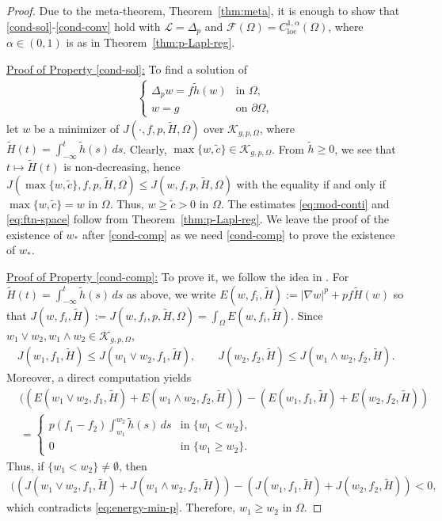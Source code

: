 \documentclass[11pt,oneside,english]{amsart}
\newcommand{\cL}{{\mathcal L}}
\newcommand{\cK}{{\mathcal K}}
\newcommand{\cF}{{\mathcal F}}
\newcommand{\al}{\alpha}
\newcommand{\loc}{\operatorname{loc}}
\newcommand{\D}{\nabla}
\numberwithin{equation}{section}
\theoremstyle{plain}
\numberwithin{equation}{section}
\begin{document}
\begin{proof}
Due to the meta-theorem, Theorem~\ref{thm:meta}, it is enough to show that \ref{cond-sol}-\ref{cond-conv} hold with $\cL=\Delta_p$ and $\cF(\Omega)=C^{1,\al}_{\loc}(\Omega)$, where $\al\in(0,1)$ is as in Theorem~\ref{thm:p-Lapl-reg}. 

\medskip

\noindent 
\underline{Proof of Property \ref{cond-sol}:} To find a solution of 
\begin{align*}
    \begin{cases}
        \Delta_pw=f\tilde h(w)&\text{in }\Omega,\\
        w=g&\text{on }\partial\Omega,
    \end{cases}
\end{align*}
let $w$ be a minimizer of $J(\cdot,f,p,\tilde H,\Omega)$ over $\cK_{g,p,\Omega}$, where $\tilde H(t)=\int_{-\infty}^t\tilde h(s)\,ds$. Clearly, $\max\{w,\tilde c\}\in \cK_{g,p,\Omega}$. From $\tilde h\ge0$, we see that $t\longmapsto \tilde H(t)$ is non-decreasing, hence $J(\max\{w,\tilde c\},f,p,\tilde H,\Omega)\le J(w,f,p,\tilde H,\Omega)$ with the equality if and only if $\max\{w,\tilde c\}=w$ in $\Omega$. Thus, $w\ge \tilde c>0$ in $\Omega$. The estimates \eqref{eq:mod-conti} and \eqref{eq:ftn-space} follow from Theorem~\ref{thm:p-Lapl-reg}. We leave the proof of the existence of $w_*$ after \ref{cond-comp} as we need \ref{cond-comp} to prove the existence of $w_*$.

\medskip


\noindent
\underline{Proof of Property \ref{cond-comp}:} To prove it, we follow the idea in \cite[1.7. Comparison Lemma]{AltPhi86}. For $\tilde H(t)=\int_{-\infty}^t\tilde h(s)\,ds$ as above, we write $E(w,f_i,\tilde H):=|\D w|^p+pf\tilde H(w)$ so that $J(w,f_i,\tilde H):=J(w,f_i,p,\tilde H,\Omega)=\int_\Omega E(w,f_i,\tilde H)$. Since $w_1\vee w_2, w_1\wedge w_2\in \cK_{g,p,\Omega}$, 
\begin{align}
    \label{eq:energy-min-p}
    J(w_1,f_1,\tilde H)\le J(w_1\vee w_2,f_1,\tilde H),\qquad J(w_2,f_2,\tilde H)\le J(w_1\wedge w_2,f_2,\tilde H).
\end{align}
Moreover, a direct computation yields
\begin{align*}
    &((E(w_1\vee w_2,f_1,\tilde H)+E(w_1\wedge w_2,f_2,\tilde H))-(E(w_1,f_1,\tilde H)+E(w_2,f_2,\tilde H))\\
    &=\begin{cases}
        p(f_1-f_2)\int_{w_1}^{w_2}\tilde h(s)\,ds  &\text{in }\{w_1<w_2\},\\
        0&\text{in }\{w_1\ge w_2\}.
    \end{cases}
\end{align*}
Thus, if $\{w_1<w_2\}\neq\emptyset$, then 
\begin{align*}
    ((J(w_1\vee w_2,f_1,\tilde H)+J(w_1\wedge w_2,f_2,\tilde H))-(J(w_1,f_1,\tilde H)+J(w_2,f_2,\tilde H))<0,
\end{align*}
which contradicts \eqref{eq:energy-min-p}. Therefore, $w_1\ge w_2$ in $\Omega.$



\end{proof}
\end{document}
